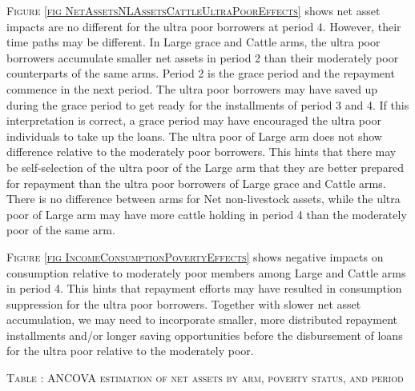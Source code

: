 \textsc{Figure \ref{fig NetAssetsNLAssetsCattleUltraPoorEffects}} shows net asset impacts are no different for the ultra poor borrowers at period 4. However, their time paths may be different. In \textsf{Large grace} and \textsf{Cattle} arms, the ultra poor borrowers accumulate smaller net assets in period 2 than their moderately poor counterparts of the same arms. Period 2 is the grace period and the repayment commence in the next period. The ultra poor borrowers may have saved up during the grace period to get ready for the installments of period 3 and 4. If this interpretation is correct, a grace period may have encouraged the ultra poor individuals to take up the loans. The ultra poor of \textsf{Large} arm does not show difference relative to the moderately poor borrowers. This hints that there may be self-selection of the ultra poor of the \textsf{Large} arm that they are better prepared for repayment than the ultra poor borrowers of \textsf{Large grace} and \textsf{Cattle} arms. There is no difference between arms for \textsf{Net non-livestock assets}, while the ultra poor of \textsf{Large} arm may have more cattle holding in period 4 than the moderately poor of the same arm. 

\textsc{Figure \ref{fig IncomeConsumptionPovertyEffects}} shows negative impacts on consumption relative to moderately poor members among \textsf{Large} and \textsf{Cattle} arms in period 4. This hints that repayment efforts may have resulted in consumption suppression for the ultra poor borrowers. Together with slower net asset accumulation, we may need to incorporate smaller, more distributed repayment installments and/or longer saving opportunities before the disbursement of loans for the ultra poor relative to the moderately poor. 




\hspace{-1cm}\begin{minipage}[t]{14cm}
\hfil\textsc{\normalsize Table \thetable: ANCOVA estimation of net assets by arm, poverty status, and period\label{tab NetAssetsTimeVaryingPovertyStatusANCOVA1}}\\
\setlength{\tabcolsep}{1pt}
\setlength{\baselineskip}{8pt}
\renewcommand{\arraystretch}{.55}
\hfil{}\\
\renewcommand{\arraystretch}{.8}
\end{minipage}

